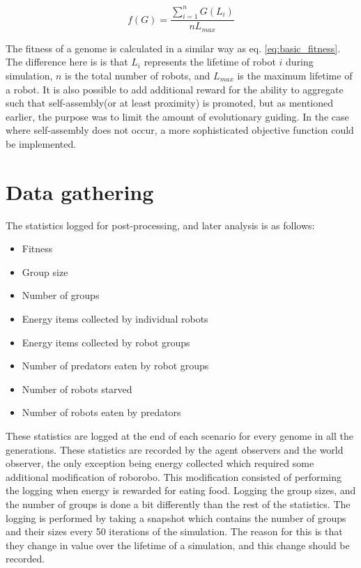 \begin{equation}
f(G) = \frac{\sum_{i=1}^n G(L_i)}{nL_{max}}
\end{equation}

The fitness of a genome is calculated in a similar way as eq. \ref{eq:basic_fitness}.
The difference here is is that $L_i$ represents the lifetime of robot $i$ during simulation, $n$ is the total number of robots, and $L_{max}$ is the maximum lifetime of a robot.
It is also possible to add additional reward for the ability to aggregate such that self-assembly(or at least proximity) is promoted, but as mentioned earlier, the purpose was to limit the amount of evolutionary guiding.
In the case where self-assembly does not occur, a more sophisticated objective function could be implemented.
		
\clearpage
\section{Data gathering}
The statistics logged for post-processing, and later analysis is as follows:
\begin{itemize}
	\item Fitness
	\item Group size
	\item Number of groups
	\item Energy items collected by individual robots
	\item Energy items collected by robot groups
	\item Number of predators eaten by robot groups
	\item Number of robots starved
	\item Number of robots eaten by predators
\end{itemize}
These statistics are logged at the end of each scenario for every genome in all the generations.
These statistics are recorded by the agent observers and the world observer, the only exception being energy collected which required some additional modification of roborobo.
This modification consisted of performing the logging when energy is rewarded for eating food.
Logging the group sizes, and the number of groups is done a bit differently than the rest of the statistics.
The logging is performed by taking a snapshot which contains the number of groups and their sizes every 50 iterations of the simulation.
The reason for this is that they change in value over the lifetime of a simulation, and this change should be recorded.



\clearpage

